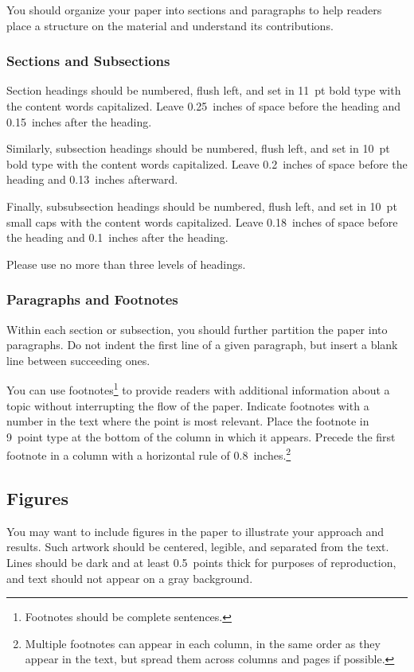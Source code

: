 \documentclass{article}
\begin{document}
You should organize your paper into sections and paragraphs to help
readers place a structure on the material and understand its
contributions.

\subsubsection{Sections and Subsections}

Section headings should be numbered, flush left, and set in 11~pt bold
type with the content words capitalized. Leave 0.25~inches of space
before the heading and 0.15~inches after the heading.

Similarly, subsection headings should be numbered, flush left, and set
in 10~pt bold type with the content words capitalized. Leave
0.2~inches of space before the heading and 0.13~inches afterward.

Finally, subsubsection headings should be numbered, flush left, and
set in 10~pt small caps with the content words capitalized. Leave
0.18~inches of space before the heading and 0.1~inches after the
heading.

Please use no more than three levels of headings.

\subsubsection{Paragraphs and Footnotes}

Within each section or subsection, you should further partition the
paper into paragraphs. Do not indent the first line of a given
paragraph, but insert a blank line between succeeding ones.

You can use footnotes\footnote{Footnotes
should be complete sentences.} to provide readers with additional
information about a topic without interrupting the flow of the paper.
Indicate footnotes with a number in the text where the point is most
relevant. Place the footnote in 9~point type at the bottom of the
column in which it appears. Precede the first footnote in a column
with a horizontal rule of 0.8~inches.\footnote{Multiple footnotes can
appear in each column, in the same order as they appear in the text,
but spread them across columns and pages if possible.}

\subsection{Figures}

You may want to include figures in the paper to illustrate
your approach and results. Such artwork should be centered,
legible, and separated from the text. Lines should be dark and at
least 0.5~points thick for purposes of reproduction, and text should
not appear on a gray background.
\end{document}
